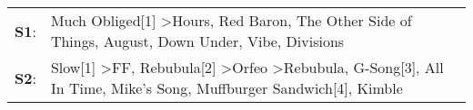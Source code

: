 \begin{supertabular}{p{0.03\textwidth}p{0.92\textwidth}}
 \textbf{S1}:  &                                                                                              Much Obliged[1]\textsuperscript{} \textgreater \enspace Hours\textsuperscript{}, \enspace Red Baron\textsuperscript{}, \enspace The Other Side of Things\textsuperscript{}, \enspace August\textsuperscript{}, \enspace Down Under\textsuperscript{}, \enspace Vibe\textsuperscript{}, \enspace Divisions\textsuperscript{}  \enspace  \\
 \textbf{S2}:  &  Slow[1]\textsuperscript{} \textgreater \enspace FF\textsuperscript{}, \enspace Rebubula[2]\textsuperscript{} \textgreater \enspace Orfeo\textsuperscript{} \textgreater \enspace Rebubula\textsuperscript{}, \enspace G-Song[3]\textsuperscript{}, \enspace All In Time\textsuperscript{}, \enspace Mike's Song\textsuperscript{}, \enspace Muffburger Sandwich[4]\textsuperscript{}, \enspace Kimble\textsuperscript{}  \enspace  \\
\end{supertabular}
